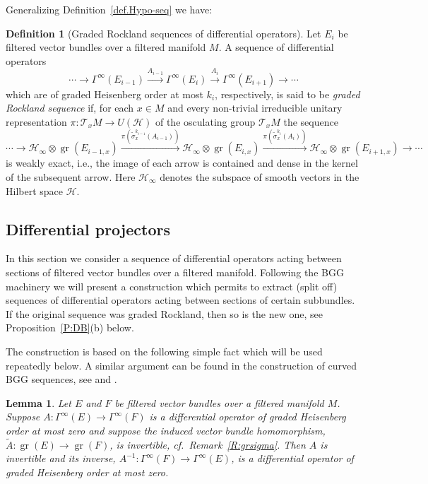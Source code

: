\documentclass[reqno,12pt]{amsart}
\DeclareMathOperator{\gr}{gr}
\theoremstyle{plain}
\newtheorem{lemma}[theorem]{Lemma}
\theoremstyle{definition}
\newtheorem{definition}[theorem]{Definition}
\begin{document}
Generalizing Definition~\ref{def.Hypo-seq} we have:


\begin{definition}[Graded Rockland sequences of differential operators]\label{D:graded_hypoelliptic_seq}
Let $E_i$ be filtered vector bundles over a filtered manifold $M$.
A sequence of differential operators
$$
\cdots\to\Gamma^\infty(E_{i-1})\xrightarrow{A_{i-1}}\Gamma^\infty(E_i)\xrightarrow{A_i}\Gamma^\infty(E_{i+1})\to\cdots
$$ 
which are of graded Heisenberg order at most $k_i$, respectively, is said to be \emph{graded Rockland sequence} if, for each $x\in M$ and every non-trivial irreducible unitary representation $\pi\colon\mathcal T_xM\to U(\mathcal H)$ of the osculating group $\mathcal T_xM$ the sequence
$$
\cdots\to
\mathcal H_\infty\otimes\gr(E_{i-1,x})\xrightarrow{\pi(\tilde\sigma^{k_{i-1}}_x(A_{i-1}))}
\mathcal H_\infty\otimes\gr(E_{i,x})\xrightarrow{\pi(\tilde\sigma^{k_i}_x(A_i))}
\mathcal H_\infty\otimes\gr(E_{i+1,x})\to\cdots
$$
is weakly exact, i.e., the image of each arrow is contained and dense in the kernel of the subsequent arrow.
Here $\mathcal H_\infty$ denotes the subspace of smooth vectors in the Hilbert space $\mathcal H$.
\end{definition}






\subsection{Differential projectors}\label{SS:DP}






In this section we consider a sequence of differential operators acting between sections of filtered vector bundles over a filtered manifold.
Following the BGG machinery \cite{CSS01,CD01,CS15} we will present a construction which permits to extract (split off) sequences of differential operators acting between sections of certain subbundles.
If the original sequence was graded Rockland, then so is the new one, see Proposition~\ref{P:DB}(b) below.
 

The construction is based on the following simple fact which will be used repeatedly below.
A similar argument can be found in the construction of curved BGG sequences, see \cite{CSS01} and \cite[Theorem~5.2]{CD01}.


\begin{lemma}\label{L:inv}
Let $E$ and $F$ be filtered vector bundles over a filtered manifold $M$.
Suppose $A\colon\Gamma^\infty(E)\to\Gamma^\infty(F)$ is a differential operator of graded Heisenberg order at most zero and suppose the induced vector bundle homomorphism, $\tilde A\colon\gr(E)\to\gr(F)$, is invertible, cf.\ Remark~\ref{R:grsigma}.
Then $A$ is invertible and its inverse, $A^{-1}\colon\Gamma^\infty(F)\to\Gamma^\infty(E)$, is a differential operator of graded Heisenberg order at most zero.
\end{lemma}
\end{document}
